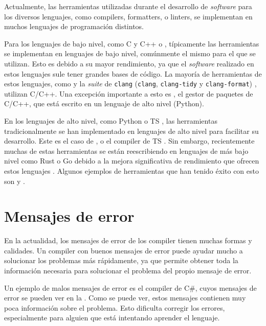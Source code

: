 Actualmente, las herramientas utilizadas durante el desarrollo de
\textit{software} para los diversos lenguajes, como \glspl{compiler},
\glspl{formatter}, o \glspl{linter}, se implementan en muchos lenguajes de
programación distintos.

Para los lenguajes de bajo nivel, como C \parencite{C} y C++ \parencite{cpp} o
, típicamente las herramientas se implementan en
lenguajes de bajo nivel, comúnmente el mismo para el que se utilizan. Esto es
debido a su mayor rendimiento, ya que el \textit{software} realizado en estos
lenguajes sule tener grandes bases de código. La mayoría de herramientas de
estos lenguajes, como  y la \textit{suite} de \verb!clang!
(\verb!clang!, \verb!clang-tidy! y \verb!clang-format!) \parencite{clang},
utilizan C/C++. Una excepción importante a esto es , el gestor de
paquetes de C/C++, que está escrito en un lenguaje de alto nivel (Python).

En los lenguajes de alto nivel, como Python \parencite{Python} o \gls{TS}
\parencite{typescript}, las herramientas tradicionalmente se han implementado en
lenguajes de alto nivel para facilitar su desarrollo. Este es el caso de
,  o el \gls{compiler} de \gls{TS}
\parencite{tsc}. Sin embargo, recientemente muchas de estas herramientas se
están reescribiendo en lenguajes de más bajo nivel como Rust \parencite{Rust} o
Go \parencite{Go} debido a la mejora significativa de rendimiento que ofrecen
estos lenguajes \parencite{typescript-go}. Algunos ejemplos de herramientas que
han tenido éxito con esto son  y .

\section{Mensajes de error}

En la actualidad, los mensajes de error de los \gls{compiler} tienen muchas
formas y calidades. Un \gls{compiler} con buenos mensajes de error puede ayudar
mucho a solucionar los problemas más rápidamente, ya que permite obtener toda la
información necesaria para solucionar el problema del propio mensaje de error.

Un ejemplo de malos mensajes de error es el \gls{compiler} de C\#, cuyos mensajes
de error se pueden ver en la . Como se puede ver, estos
mensajes contienen muy poca información sobre el problema. Esto dificulta
corregir los errores, especialmente para alguien que está intentando aprender el
lenguaje.

